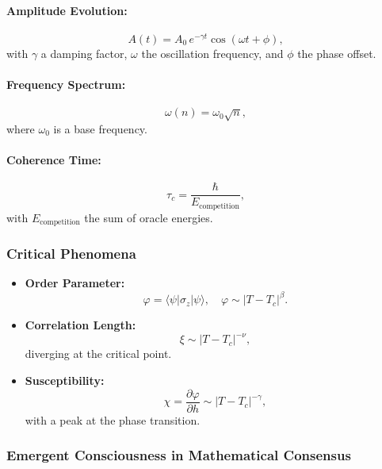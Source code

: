\documentclass[11pt]{article}
\begin{document}
\paragraph{Amplitude Evolution:}
\[
A(t)=A_0\,e^{-\gamma t}\cos(\omega t+\phi),
\]
with $\gamma$ a damping factor, $\omega$ the oscillation frequency, and $\phi$ the phase offset.

\paragraph{Frequency Spectrum:}
\[
\omega(n)=\omega_0\sqrt{n},
\]
where $\omega_0$ is a base frequency.

\paragraph{Coherence Time:}
\[
\tau_c=\frac{\hbar}{E_{\text{competition}}},
\]
with $E_{\text{competition}}$ the sum of oracle energies.

\subsubsection{Critical Phenomena}

\begin{itemize}
    \item \textbf{Order Parameter:} 
    \[
    \varphi=\langle \psi|\sigma_z|\psi\rangle,\quad \varphi\sim |T-T_c|^\beta.
    \]
    \item \textbf{Correlation Length:}
    \[
    \xi\sim |T-T_c|^{-\nu},
    \]
    diverging at the critical point.
    \item \textbf{Susceptibility:}
    \[
    \chi=\frac{\partial \varphi}{\partial h}\sim |T-T_c|^{-\gamma},
    \]
    with a peak at the phase transition.
\end{itemize}

\subsubsection{Emergent Consciousness in Mathematical Consensus}
\end{document}
